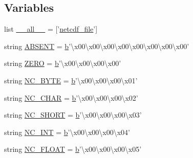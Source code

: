 \subsection*{Variables}
\begin{DoxyCompactItemize}
\item 
list \hyperlink{namespacescipy_1_1io_1_1netcdf_a2380a33acb5c47698a753a141017d203}{\+\_\+\+\_\+all\+\_\+\+\_\+} = \mbox{[}'\hyperlink{classscipy_1_1io_1_1netcdf_1_1netcdf__file}{netcdf\+\_\+file}'\mbox{]}
\item 
string \hyperlink{namespacescipy_1_1io_1_1netcdf_a41609cb30697ff3aa50bffa1f3dd0483}{A\+B\+S\+E\+N\+T} = \hyperlink{gen__mat5files_8m_a7b38767b3b6a8dae167e5afa4fc340b0}{b}'\textbackslash{}x00\textbackslash{}x00\textbackslash{}x00\textbackslash{}x00\textbackslash{}x00\textbackslash{}x00\textbackslash{}x00\textbackslash{}x00'
\item 
string \hyperlink{namespacescipy_1_1io_1_1netcdf_a7ed9eacba238a78d0b9f134e97e7fd2f}{Z\+E\+R\+O} = \hyperlink{gen__mat5files_8m_a7b38767b3b6a8dae167e5afa4fc340b0}{b}'\textbackslash{}x00\textbackslash{}x00\textbackslash{}x00\textbackslash{}x00'
\item 
string \hyperlink{namespacescipy_1_1io_1_1netcdf_a2c1c70da8b9d298b2af60da431c6760a}{N\+C\+\_\+\+B\+Y\+T\+E} = \hyperlink{gen__mat5files_8m_a7b38767b3b6a8dae167e5afa4fc340b0}{b}'\textbackslash{}x00\textbackslash{}x00\textbackslash{}x00\textbackslash{}x01'
\item 
string \hyperlink{namespacescipy_1_1io_1_1netcdf_ae011be8897be34d1cdbc7b4dcc724a27}{N\+C\+\_\+\+C\+H\+A\+R} = \hyperlink{gen__mat5files_8m_a7b38767b3b6a8dae167e5afa4fc340b0}{b}'\textbackslash{}x00\textbackslash{}x00\textbackslash{}x00\textbackslash{}x02'
\item 
string \hyperlink{namespacescipy_1_1io_1_1netcdf_a6c281677303177cd1fe21f97d7d8084e}{N\+C\+\_\+\+S\+H\+O\+R\+T} = \hyperlink{gen__mat5files_8m_a7b38767b3b6a8dae167e5afa4fc340b0}{b}'\textbackslash{}x00\textbackslash{}x00\textbackslash{}x00\textbackslash{}x03'
\item 
string \hyperlink{namespacescipy_1_1io_1_1netcdf_a4d571dd2c8b99f6db2db206abb88bea6}{N\+C\+\_\+\+I\+N\+T} = \hyperlink{gen__mat5files_8m_a7b38767b3b6a8dae167e5afa4fc340b0}{b}'\textbackslash{}x00\textbackslash{}x00\textbackslash{}x00\textbackslash{}x04'
\item 
string \hyperlink{namespacescipy_1_1io_1_1netcdf_ae577fefb9ce04df681e3b13e57636005}{N\+C\+\_\+\+F\+L\+O\+A\+T} = \hyperlink{gen__mat5files_8m_a7b38767b3b6a8dae167e5afa4fc340b0}{b}'\textbackslash{}x00\textbackslash{}x00\textbackslash{}x00\textbackslash{}x05'

\end{DoxyCompactItemize}
